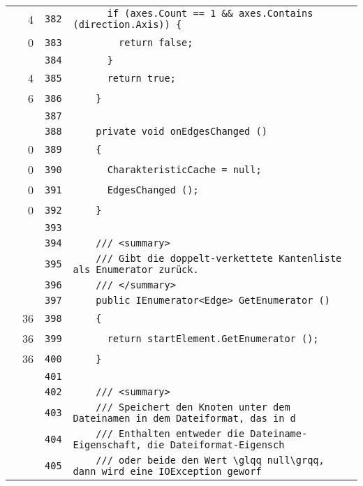 \documentclass[a4paper,10pt]{article}
\begin{document}
\begin{longtable}[l]{lrrl}
\cellcolor{green} & 4 & \verb~382~ & \verb~      if (axes.Count == 1 && axes.Contains (direction.Axis)) {~\\
\cellcolor{red} & 0 & \verb~383~ & \verb~        return false;~\\
\cellcolor{gray} &  & \verb~384~ & \verb~      }~\\
\cellcolor{green} & 4 & \verb~385~ & \verb~      return true;~\\
\cellcolor{green} & 6 & \verb~386~ & \verb~    }~\\
\cellcolor{gray} &  & \verb~387~ & \verb~~\\
\cellcolor{gray} &  & \verb~388~ & \verb~    private void onEdgesChanged ()~\\
\cellcolor{red} & 0 & \verb~389~ & \verb~    {~\\
\cellcolor{red} & 0 & \verb~390~ & \verb~      CharakteristicCache = null;~\\
\cellcolor{red} & 0 & \verb~391~ & \verb~      EdgesChanged ();~\\
\cellcolor{red} & 0 & \verb~392~ & \verb~    }~\\
\cellcolor{gray} &  & \verb~393~ & \verb~~\\
\cellcolor{gray} &  & \verb~394~ & \verb~    /// <summary>~\\
\cellcolor{gray} &  & \verb~395~ & \verb~    /// Gibt die doppelt-verkettete Kantenliste als Enumerator zurück.~\\
\cellcolor{gray} &  & \verb~396~ & \verb~    /// </summary>~\\
\cellcolor{gray} &  & \verb~397~ & \verb~    public IEnumerator<Edge> GetEnumerator ()~\\
\cellcolor{green} & 36 & \verb~398~ & \verb~    {~\\
\cellcolor{green} & 36 & \verb~399~ & \verb~      return startElement.GetEnumerator ();~\\
\cellcolor{green} & 36 & \verb~400~ & \verb~    }~\\
\cellcolor{gray} &  & \verb~401~ & \verb~~\\
\cellcolor{gray} &  & \verb~402~ & \verb~    /// <summary>~\\
\cellcolor{gray} &  & \verb~403~ & \verb~    /// Speichert den Knoten unter dem Dateinamen in dem Dateiformat, das in d~\\
\cellcolor{gray} &  & \verb~404~ & \verb~    /// Enthalten entweder die Dateiname-Eigenschaft, die Dateiformat-Eigensch~\\
\cellcolor{gray} &  & \verb~405~ & \verb~    /// oder beide den Wert \glqq null\grqq, dann wird eine IOException geworf~\\

\end{longtable}
\end{document}
